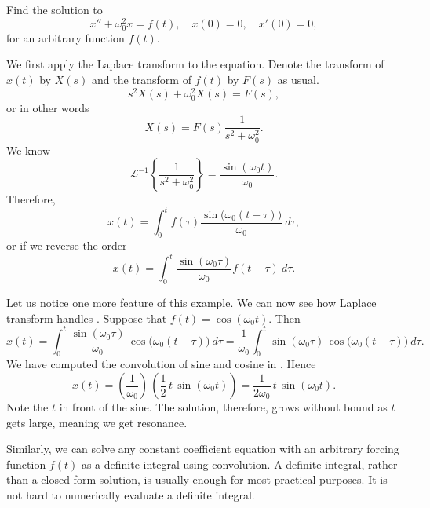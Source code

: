 \documentclass[12pt]{book}
\begin{document}
\begin{example}
Find the solution to
\begin{equation*}
x'' + \omega_0^2 x = f(t) , \quad x(0) = 0, \quad x'(0) = 0 ,
\end{equation*}
for an arbitrary function $f(t)$.

We first apply the Laplace transform to the equation.  Denote
the transform of $x(t)$ by $X(s)$ and the transform of $f(t)$ by
$F(s)$ as usual.
\begin{equation*}
s^2 X(s) + \omega_0^2 X(s) = F(s) ,
\end{equation*}
or in other words
\begin{equation*}
X(s) = F(s) \frac{1}{s^2+ \omega_0^2} .
\end{equation*}
We know
\begin{equation*}
{\mathcal{L}}^{-1} \left\{
\frac{1}{s^2+ \omega_0^2}
\right\} = 
\frac{\sin (\omega_0 t)}{\omega_0} .
\end{equation*}
Therefore,
\begin{equation*}
x(t) = 
\int_0^t
f(\tau) 
\frac{\sin \bigl( \omega_0 (t-\tau) \bigr)}{\omega_0} ~ d\tau ,
\end{equation*}
or if we reverse the order
\begin{equation*}
x(t) = 
\int_0^t
\frac{\sin (\omega_0 \tau)}{\omega_0}
f(t-\tau) ~ d\tau .
\end{equation*}
\end{example}

Let us notice one more feature of this example.
We can now see how Laplace transform
handles .  Suppose that $f(t) =
\cos (\omega_0 t)$.  Then
\begin{equation*}
x(t) = 
\int_0^t
\frac{\sin (\omega_0 \tau)}{\omega_0} \,
\cos \bigl( \omega_0 (t-\tau) \bigr) ~ d\tau
=
\frac{1}{\omega_0}
\int_0^t
\sin ( \omega_0 \tau ) \,
\cos \bigl(\omega_0 (t-\tau) \bigr) ~ d\tau .
\end{equation*}
We have computed the convolution of sine and cosine in
.  Hence
\begin{equation*}
x(t) =
\left(
\frac{1}{\omega_0}
\right) \,
\left(
\frac{1}{2} \,
t \,
\sin ( \omega_0 t )
\right)
=
\frac{1}{2 \omega_0} \,
t
\,
\sin ( \omega_0 t ).
\end{equation*}
Note the $t$ in front of the sine.  The solution, therefore, grows without
bound as $t$ gets large, meaning we get resonance.

Similarly,
we can solve any constant coefficient equation with an arbitrary forcing
function $f(t)$ as a definite integral using convolution.
A definite integral, rather than a closed form solution, is usually enough
for most practical purposes.  It is
not hard to numerically evaluate a definite integral.
\end{document}
